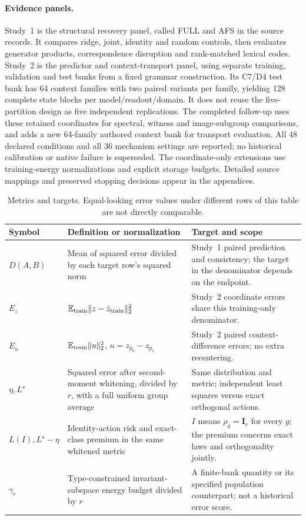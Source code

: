 \documentclass[10pt]{article}
\newcommand{\Id}{\mathbf{I}}
\begin{document}
\paragraph{Evidence panels.}
Study~1 is the structural recovery panel, called FULL and AFS in the source records. It compares ridge, joint, identity and random controls, then evaluates generator products, correspondence disruption and rank-matched lexical codes. Study~2 is the predictor and context-transport panel, using separate training, validation and test banks from a fixed grammar construction. Its C7/D4 test bank has 64 context families with two paired variants per family, yielding 128 complete state blocks per model/readout/domain. It does not reuse the five-partition design as five independent replications. The completed follow-up uses these retained coordinates for spectral, witness and image-subgroup comparisons, and adds a new 64-family authored context bank for transport evaluation. All 48 declared conditions and all 36 mechanism settings are reported; no historical calibration or native failure is superseded. The coordinate-only extensions use training-energy normalizations and explicit storage budgets. Detailed source mappings and preserved stopping decisions appear in the appendices.

\begin{table}[t]
\centering\small
\begin{tabular}{@{}p{}p{}p{}@{}}
\toprule
Symbol & Definition or normalization & Target and scope \\
\midrule
$D(A,B)$ & Mean of squared error divided by each target row's squared norm & Study~1 paired prediction and consistency; the target in the denominator depends on the endpoint. \\
$E_z$ & $\mathbb E_{\rm train}\|z-\bar z_{\rm train}\|_2^2$ & Study~2 coordinate errors share this training-only denominator. \\
$E_u$ & $\mathbb E_{\rm train}\|u\|_2^2$, $u=z_{p_0}-z_{p_1}$ & Study~2 paired context-difference errors; no extra recentering. \\
$\eta,L^\star$ & Squared error after second-moment whitening, divided by $r$, with a full uniform group average & Same distribution and metric; independent least squares versus exact orthogonal actions. \\
$L(I),L^\star-\eta$ & Identity-action risk and exact-class premium in the same whitened metric & $I$ means $\rho_g=\Id_r$ for every $g$; the premium concerns exact laws and orthogonality jointly. \\
$\gamma_r$ & Type-constrained invariant-subspace energy budget divided by $r$ & A finite-bank quantity or its specified population counterpart; not a historical error score. \\
\bottomrule
\end{tabular}
\caption{Metrics and targets. Equal-looking error values under different rows of this table are not directly comparable.}
\label{tab:metric-contract}
\end{table}
\end{document}
